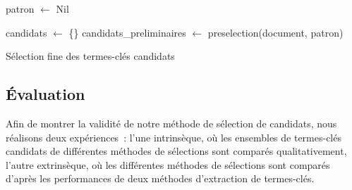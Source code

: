         \begin{algorithm}[h!]
          \DontPrintSemicolon{}

          \BlankLine

          patron $\leftarrow$ Nil\;\label{algo:line:start_preselection}

          candidats $\leftarrow$ \{\}\;
          candidats\_preliminaires $\leftarrow$ preselection(document, patron)\;\label{algo:line:end_preselection}

          \label{algo:line:end_filtering}


          \caption{Sélection fine des termes-clés candidats
                   \label{algo:candidate_pruning}}
        \end{algorithm}

    \subsection{Évaluation}
    \label{subsec:main:domain_independent_keyphrase_extraction-keyphrase_candidate_selection-evaluation}
      Afin de montrer la validité de notre méthode de sélection de candidats,
      nous réalisons deux expériences~: l'une intrinsèque, où les ensembles de
      termes-clés candidats de différentes méthodes de sélections sont comparés
      qualitativement, l'autre extrinsèque, où les différentes méthodes de
      sélections sont comparés d'après les performances de deux méthodes
      d'extraction de termes-clés.


